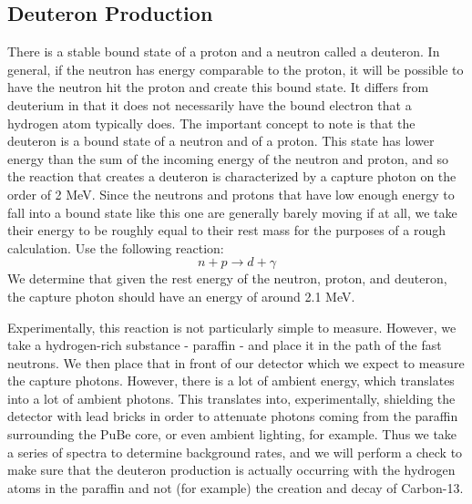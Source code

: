 \documentclass{article}
\begin{document}
  \subsection{Deuteron Production}
  There is a stable bound state of a proton and a neutron called a deuteron.  In general, if the neutron has energy comparable to the proton, it will be possible to have the neutron hit the proton and create this bound state.  It differs from deuterium in that it does not necessarily have the bound electron that a hydrogen atom typically does.  The important concept to note is that the deuteron is a bound state of a neutron and of a proton.  This state has lower energy than the sum of the incoming energy of the neutron and proton, and so the reaction that creates a deuteron is characterized by a capture photon on the order of 2 MeV.  Since the neutrons and protons that have low enough energy to fall into a bound state like this one are generally barely moving if at all, we take their energy to be roughly equal to their rest mass for the purposes of a rough calculation.  Use the following reaction:
  \begin{equation*}
    n + p \rightarrow d + \gamma
  \end{equation*}
  We determine that given the rest energy of the neutron, proton, and deuteron, the capture photon should have an energy of around 2.1 MeV.

  \hspace{.25cm}

  Experimentally, this reaction is not particularly simple to measure.  However, we take a hydrogen-rich substance - paraffin - and place it in the path of the fast neutrons.  We then place that in front of our detector which we expect to measure the capture photons.  However, there is a lot of ambient energy, which translates into a lot of ambient photons.  This translates into, experimentally, shielding the detector with lead bricks in order to attenuate photons coming from the paraffin surrounding the PuBe core, or even ambient lighting, for example.  Thus we take a series of spectra to determine background rates, and we will perform a check to make sure that the deuteron production is actually occurring with the hydrogen atoms in the paraffin and not (for example) the creation and decay of Carbon-13.
\end{document}
